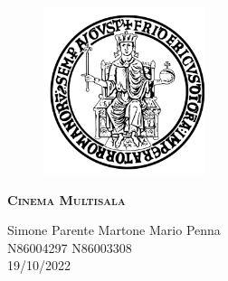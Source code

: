 \documentclass{report}
\begin{document}
    \begin{figure}[htbp!]
        \begin{center}
            \includegraphics[width=.25\textwidth]{Immagini/FedericoII.png}
        \end{center}
    \end{figure}
    
    \begin{center}
        {\scshape\Large\bfseries Cinema Multisala}
    \end{center}
    
    \begin{center}
        Simone Parente Martone Mario Penna \\  N86004297 N86003308 \\ 19/10/2022
    \end{center}
    
    \newpage
    
    \tableofcontents
    
    
    
    
\end{document}
